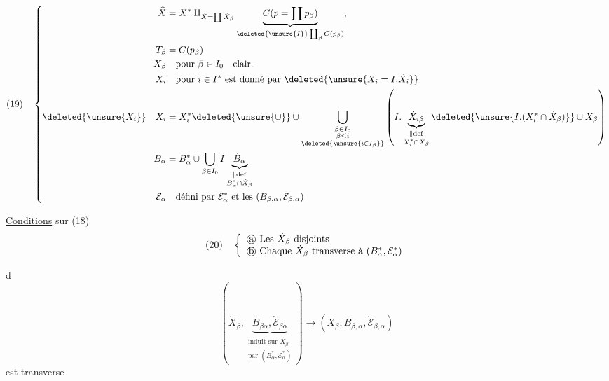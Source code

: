 \[
(19)\quad\left\{
\begin{aligned}
\widehat X&=X^*\amalg_{\dot X=\coprod\dot X_\beta}
\underbrace{C(p=\coprod p_\beta)}
_{\deleted{\unsure{I}}\coprod_\beta C(p_\beta)},\\
T_\beta&=C(p_\beta)\\
X_\beta&\quad\text{pour }\beta\in I_0\quad\text{clair}.\\
X_i&\quad\text{pour }i\in I^*\text{ est donné par }
\deleted{\unsure{X_i=I.\dot X_i}}\\
\deleted{\unsure{X_i}}\quad X_i&=X_i^*\deleted{\unsure{\cup}}
\cup\bigcup_{\substack{\beta\in I_0\\\beta\le i\\\deleted{\unsure{i\in I_\beta}}}}
\left(I.\underbrace{\dot X_{i\beta}}
_{\substack{\parallel\mathrm{def}\\X_i^*\cap\dot X_\beta}}
\deleted{\unsure{I.(X_i^*\cap\dot X_\beta)}}\cup X_\beta\right)\\
B_\alpha&=B_\alpha^*\cup\bigcup_{\beta\in I_0}
I\underbrace{\dot B_\alpha}_{\substack{\parallel\mathrm{def}\\B_\alpha^*\cap\dot X_\beta}}\\
\mathcal E_\alpha&\quad\text{défini par }\mathcal E_\alpha^*
\text{ et les }(B_{\beta,\alpha},\mathcal E_{\beta,\alpha})
\end{aligned}\right.
\]

\uline{Conditions} sur (18)
\[
(20)\quad\left\{
\begin{array}{l}
\text{\textcircled{a} Les }\dot X_\beta\text{ disjoints}\\
\text{\textcircled{b} Chaque }\dot X_\beta\text{ transverse à }(B_\alpha^*,\mathcal E_\alpha^*)
\end{array}\right.
\]


\textcircled{d}
\[
(\dot X_\beta,
\underbrace{\dot B_{\beta\alpha},\dot{\mathcal E}_{\beta\alpha}}
_{\substack{\text{induit sur }\dot X_\beta\\
\text{par }(B_\alpha^*,\mathcal E_\alpha^*)}})
\longrightarrow
(X_\beta,B_{\beta,\alpha},\dot{\mathcal E}_{\beta,\alpha})
\]
est transverse

